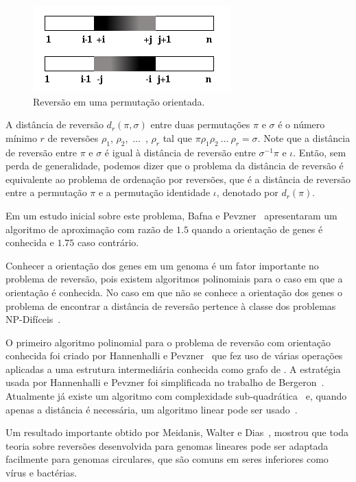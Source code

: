 \begin{figure}
  \centering
  \includegraphics{images/rev_orientada.png}
  \caption{Reversão em uma permutação orientada.}
  \label{fig:rev_orientada}
\end{figure}

A distância de reversão $d_{r}(\pi,\sigma)$ entre duas permutações
$\pi$ e $\sigma$ é o número mínimo $r$ de reversões $\rho_{1}$,
$\rho_{2}$,~$\ldots$~, $\rho_{r}$ tal que
$\pi \rho_{1} \rho_{2}~\ldots~\rho_{r} = \sigma$. Note que a distância
de reversão entre $\pi$ e $\sigma$ é igual à distância de reversão
entre $\sigma^{-1} \pi$ e $\iota$. Então, sem perda de generalidade,
podemos dizer que o problema da distância de reversão é equivalente ao
problema de ordenação por reversões, que é a distância de reversão
entre a permutação $\pi$ e a permutação identidade $\iota$, denotado
por $d_{r}(\pi)$.

Em um estudo inicial sobre este problema, Bafna e
Pevzner~\cite{BafnaPevzner*1996} apresentaram um algoritmo de
aproximação com razão de $1.5$ quando a orientação de genes é
conhecida e $1.75$ caso contrário.

Conhecer a orientação dos genes em um genoma é um fator importante no
problema de reversão, pois existem algoritmos polinomiais para o caso
em que a orientação é conhecida. No caso em que não se conhece a
orientação dos genes o problema de encontrar a distância de reversão
pertence à classe dos problemas NP-Difíceis~\cite{Caprara*1997}.

O primeiro algoritmo polinomial para o problema de reversão com
orientação conhecida foi criado por Hannenhalli e
Pevzner~\cite{HannenhalliPevzner*1995} que fez uso de várias operações
aplicadas a uma estrutura intermediária conhecida como grafo
de \bkp{}. A estratégia usada por Hannenhalli e Pevzner foi
simplificada no trabalho de Bergeron~\cite{Bergeron*2005}. Atualmente
já existe um algoritmo com complexidade
sub-quadrática~\cite{TannierSagot*2004} e, quando apenas a distância é
necessária, um algoritmo linear pode ser
usado~\cite{BaderMoretYan*2001}.

Um resultado importante obtido por Meidanis, Walter e
Dias~\cite{MeidanisWalterDias*2000}, mostrou que toda teoria sobre
reversões desenvolvida para genomas lineares pode ser adaptada
facilmente para genomas circulares, que são comuns em seres inferiores
como vírus e bactérias.

